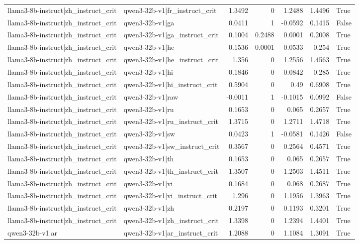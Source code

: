 \begin{table}
\begin{tabular}{l l r r r r l}
llama3-8b-instruct|zh_instruct_crit & qwen3-32b-v1|fr_instruct_crit & 1.3492 & 0 & 1.2488 & 1.4496 & True \\
llama3-8b-instruct|zh_instruct_crit & qwen3-32b-v1|ga & 0.0411 & 1 & -0.0592 & 0.1415 & False \\
llama3-8b-instruct|zh_instruct_crit & qwen3-32b-v1|ga_instruct_crit & 0.1004 & 0.2488 & 0.0001 & 0.2008 & True \\
llama3-8b-instruct|zh_instruct_crit & qwen3-32b-v1|he & 0.1536 & 0.0001 & 0.0533 & 0.254 & True \\
llama3-8b-instruct|zh_instruct_crit & qwen3-32b-v1|he_instruct_crit & 1.356 & 0 & 1.2556 & 1.4563 & True \\
llama3-8b-instruct|zh_instruct_crit & qwen3-32b-v1|hi & 0.1846 & 0 & 0.0842 & 0.285 & True \\
llama3-8b-instruct|zh_instruct_crit & qwen3-32b-v1|hi_instruct_crit & 0.5904 & 0 & 0.49 & 0.6908 & True \\
llama3-8b-instruct|zh_instruct_crit & qwen3-32b-v1|raw & -0.0011 & 1 & -0.1015 & 0.0992 & False \\
llama3-8b-instruct|zh_instruct_crit & qwen3-32b-v1|ru & 0.1653 & 0 & 0.065 & 0.2657 & True \\
llama3-8b-instruct|zh_instruct_crit & qwen3-32b-v1|ru_instruct_crit & 1.3715 & 0 & 1.2711 & 1.4718 & True \\
llama3-8b-instruct|zh_instruct_crit & qwen3-32b-v1|sw & 0.0423 & 1 & -0.0581 & 0.1426 & False \\
llama3-8b-instruct|zh_instruct_crit & qwen3-32b-v1|sw_instruct_crit & 0.3567 & 0 & 0.2564 & 0.4571 & True \\
llama3-8b-instruct|zh_instruct_crit & qwen3-32b-v1|th & 0.1653 & 0 & 0.065 & 0.2657 & True \\
llama3-8b-instruct|zh_instruct_crit & qwen3-32b-v1|th_instruct_crit & 1.3507 & 0 & 1.2503 & 1.4511 & True \\
llama3-8b-instruct|zh_instruct_crit & qwen3-32b-v1|vi & 0.1684 & 0 & 0.068 & 0.2687 & True \\
llama3-8b-instruct|zh_instruct_crit & qwen3-32b-v1|vi_instruct_crit & 1.296 & 0 & 1.1956 & 1.3963 & True \\
llama3-8b-instruct|zh_instruct_crit & qwen3-32b-v1|zh & 0.2197 & 0 & 0.1193 & 0.3201 & True \\
llama3-8b-instruct|zh_instruct_crit & qwen3-32b-v1|zh_instruct_crit & 1.3398 & 0 & 1.2394 & 1.4401 & True \\
qwen3-32b-v1|ar & qwen3-32b-v1|ar_instruct_crit & 1.2088 & 0 & 1.1084 & 1.3091 & True \\

\end{tabular}
\end{table}
